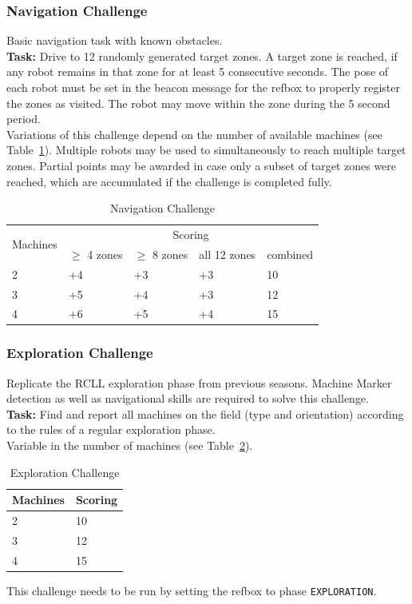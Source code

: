 \documentclass[12pt,twoside]{article}
\newcommand{\reftab}[1]{Table~\ref{#1}}
\begin{document}
\subsubsection{Navigation Challenge}\label{sec:challenge-navigation}
Basic navigation task with known obstacles.\\
\textbf{Task:} Drive to 12 randomly generated target zones. A target zone is
reached, if any robot remains in that zone for at least 5 consecutive seconds.
The pose of each robot must be set in the beacon message
for the \ac{refbox} to properly register the zones as visited.
The robot may move within the zone during the 5 second period.\\
Variations of this challenge depend on the number of available machines
(see \reftab{tab:challenge-navigation}).
Multiple robots may be used to simultaneously to reach multiple target zones.
Partial points may be awarded in case only a subset of target zones were
reached, which are accumulated if the challenge is completed fully.

\begin{table}[!htb]
 \centering
 \begin{tabular}{l|l|l|l|l}
  \multirow{2}{*}{Machines}
  & \multicolumn{4}{c}{Scoring} \\\cline{2-5}
	& $\geq$ 4 zones  & $\geq$ 8 zones & all 12 zones  & combined \\\hline\hline
	 2 & +4 & +3 & +3 & 10 \\
	 3 & +5 & +4 & +3 & 12 \\
	 4 & +6 & +5 & +4 & 15 \\
 \end{tabular}
 \caption{Navigation Challenge}
 \label{tab:challenge-navigation}
\end{table}

\subsubsection{Exploration Challenge}\label{sec:challenge-exploration}
Replicate the \ac{RCLL} exploration phase from previous seasons.
Machine Marker detection as well as navigational skills are required to solve
this challenge.\\
\textbf{Task:} Find and report all machines on the field (type and orientation)
according to the rules of a regular exploration phase.
\\
Variable in the number of machines
(see \reftab{tab:challenge-exploration}).
\begin{table}[!htb]
 \centering
 \begin{tabular}{l|l}
  Machines & Scoring \\\hline
  2   & 10 \\
  3   & 12 \\
  4   & 15 \\
 \end{tabular}
 \caption{Exploration Challenge}
 \label{tab:challenge-exploration}
\end{table}
This challenge needs to be run by setting the \ac{refbox} to phase
\texttt{EXPLORATION}.
\end{document}

